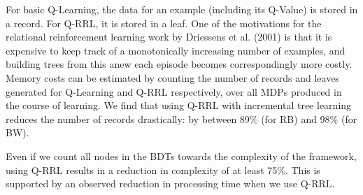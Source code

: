 For basic Q-Learning, the data for an example (including its Q-Value) is stored 
in a record. For Q-RRL, it is stored in a leaf. 
One of the motivations for the relational reinforcement learning work by 
Driessens et al. (2001) is that it is expensive to keep track of a monotonically 
increasing number of examples, and building trees from this anew each episode 
becomes correspondingly more costly.  
Memory costs can be estimated by counting the number of records and leaves 
generated for Q-Learning and Q-RRL respectively, over all MDPs produced in the 
course of learning. 
We find that using Q-RRL with incremental tree learning reduces the number of 
records drastically: by between 89\% (for RB) and 98\% (for BW). 

Even if we count all nodes in the BDTs towards the complexity of the framework, 
using Q-RRL results in a reduction in complexity of at least 75\%.
This is supported by an observed reduction in processing time when we use Q-RRL.


